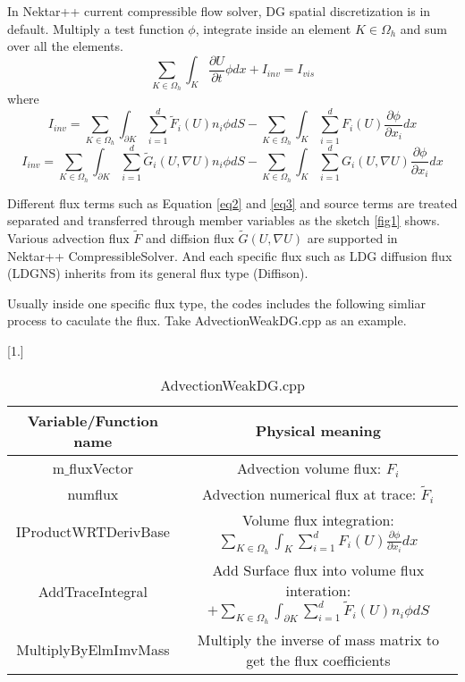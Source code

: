 In Nektar++ current compressible flow solver, DG spatial discretization is in default. Multiply a test function $\phi$, integrate inside an element $K\in \Omega_{h}$ and sum over all the elements.
\begin{equation}
  \sum\limits_{K\in \Omega_{h}}{\int_{K}{\frac{\partial U}{\partial t}\phi dx}}+I_{inv}=I_{vis}
\end{equation}
where
\begin{equation}\label{eq2}
I_{inv}= \sum\limits_{K\in \Omega_{h}}{\int_{\partial K}{\sum\limits_{i=1}^{d}{\widetilde{F}_{i}(U)n_{i}\phi}}dS}-
\sum\limits_{K\in \Omega_{h}}{\int_{K}{\sum\limits_{i=1}^{d}{F_{i}(U)\frac{\partial \phi}{\partial x_{i}}dx}}}
\end{equation}
\begin{equation}\label{eq3}
I_{inv}= \sum\limits_{K\in \Omega_{h}}{\int_{\partial K}{\sum\limits_{i=1}^{d}{\widetilde{G}_{i}(U,\nabla U)n_{i}\phi}}dS}-
\sum\limits_{K\in \Omega_{h}}{\int_{K}{\sum\limits_{i=1}^{d}{G_{i}(U,\nabla U)\frac{\partial \phi}{\partial x_{i}}dx}}}
\end{equation}

Different flux terms such as Equation \eqref{eq2} and \eqref{eq3} and source terms are treated separated and transferred through member variables as the sketch \ref{fig1} shows.
Various advection flux $\widetilde{F}$ and diffsion flux $\widetilde{G}(U,\nabla U)$ are supported in Nektar++ CompressibleSolver. And each specific flux such as LDG diffusion flux (LDGNS) inherits from its general flux type (Diffison).

Usually inside one specific flux type, the codes includes the following simliar process to caculate the flux. Take AdvectionWeakDG.cpp as an example.
\begin {table}[!h]
\caption {AdvectionWeakDG.cpp} \label{table1} 
\begin{center}
\scalebox{0.9}[1.]{
\begin{tabular}{ | c | c|}
  \hline      
Variable/Function name & Physical meaning \\  
  \hline
  m$\_$fluxVector  & Advection volume flux: $F_{i}$\\
  \hline
  numflux  & Advection numerical flux at trace: $\widetilde{F}_{i}$\\
   \hline
  IProductWRTDerivBase &  Volume flux integration: $\sum\limits_{K\in \Omega_{h}}{\int_{K}{\sum\limits_{i=1}^{d}{F_{i}(U)\frac{\partial \phi}{\partial x_{i}}dx}}}$ \\
   \hline
   AddTraceIntegral &  Add Surface flux into volume flux interation: $+\sum\limits_{K\in \Omega_{h}}{\int_{\partial K}{\sum\limits_{i=1}^{d}{\widetilde{F}_{i}(U)n_{i}\phi}}dS}$\\ 
  \hline
  MultiplyByElmImvMass& Multiply the inverse of mass matrix to get the flux coefficients\\
 \hline
\end{tabular}
}
\end{center}
\end{table}
\clearpage
